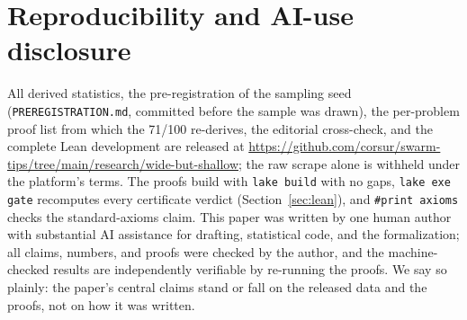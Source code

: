 \documentclass[11pt]{article}
\begin{document}
\section*{Reproducibility and AI-use disclosure}

All derived statistics, the pre-registration of the sampling seed
(\texttt{PREREGISTRATION.md}, committed before the sample was drawn), the per-problem proof
list from which the 71/100 re-derives, the editorial cross-check, and the complete Lean
development are released at
\url{https://github.com/corsur/swarm-tips/tree/main/research/wide-but-shallow}; the raw
scrape alone is withheld under the platform's terms. The proofs build with
\texttt{lake build} with no gaps, \texttt{lake exe gate} recomputes every certificate
verdict (Section~\ref{sec:lean}), and \texttt{\#print axioms} checks the standard-axioms
claim. This paper was written by one human author
with substantial AI assistance for drafting,
statistical code, and the formalization; all claims, numbers, and proofs were checked by the author, and the
machine-checked results are independently verifiable by re-running the proofs. We say so plainly: the paper's
central claims stand or fall on the released data and the proofs, not on how it was written.
\end{document}
